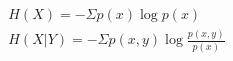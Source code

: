 \documentclass[preview, convert={density=300,size=1080x800,outext=.png}]{standalone}
\begin{document}
\begin{align*}
    H(X) = -\Sigma p(x)\log p(x) \\
    H(X|Y) = -\Sigma p(x,y) \log \frac{p(x,y)}{p(x)}
\end{align*}
\end{document}
